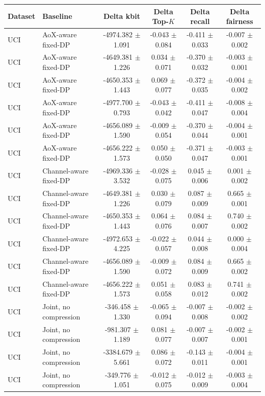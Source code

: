 \begin{tabular}{llcccc}
\toprule
Dataset & Baseline & Delta kbit & Delta Top-$K$ & Delta recall & Delta fairness \\
\midrule
UCI & AoX-aware fixed-DP & -4974.382 $\pm$ 1.091 & -0.043 $\pm$ 0.084 & -0.411 $\pm$ 0.033 & -0.007 $\pm$ 0.002 \\
UCI & AoX-aware fixed-DP & -4649.381 $\pm$ 1.226 & 0.034 $\pm$ 0.071 & -0.370 $\pm$ 0.032 & -0.003 $\pm$ 0.001 \\
UCI & AoX-aware fixed-DP & -4650.353 $\pm$ 1.443 & 0.069 $\pm$ 0.077 & -0.372 $\pm$ 0.035 & -0.004 $\pm$ 0.002 \\
UCI & AoX-aware fixed-DP & -4977.700 $\pm$ 0.793 & -0.043 $\pm$ 0.042 & -0.411 $\pm$ 0.047 & -0.008 $\pm$ 0.004 \\
UCI & AoX-aware fixed-DP & -4656.089 $\pm$ 1.590 & -0.009 $\pm$ 0.054 & -0.370 $\pm$ 0.044 & -0.004 $\pm$ 0.001 \\
UCI & AoX-aware fixed-DP & -4656.222 $\pm$ 1.573 & 0.050 $\pm$ 0.050 & -0.371 $\pm$ 0.047 & -0.003 $\pm$ 0.001 \\
UCI & Channel-aware fixed-DP & -4969.336 $\pm$ 3.532 & -0.028 $\pm$ 0.075 & 0.045 $\pm$ 0.006 & 0.001 $\pm$ 0.002 \\
UCI & Channel-aware fixed-DP & -4649.381 $\pm$ 1.226 & 0.030 $\pm$ 0.079 & 0.087 $\pm$ 0.009 & 0.665 $\pm$ 0.001 \\
UCI & Channel-aware fixed-DP & -4650.353 $\pm$ 1.443 & 0.064 $\pm$ 0.076 & 0.084 $\pm$ 0.007 & 0.740 $\pm$ 0.002 \\
UCI & Channel-aware fixed-DP & -4972.653 $\pm$ 4.225 & -0.022 $\pm$ 0.057 & 0.044 $\pm$ 0.008 & 0.000 $\pm$ 0.004 \\
UCI & Channel-aware fixed-DP & -4656.089 $\pm$ 1.590 & -0.009 $\pm$ 0.072 & 0.084 $\pm$ 0.009 & 0.665 $\pm$ 0.002 \\
UCI & Channel-aware fixed-DP & -4656.222 $\pm$ 1.573 & 0.051 $\pm$ 0.058 & 0.083 $\pm$ 0.012 & 0.741 $\pm$ 0.002 \\
UCI & Joint, no compression & -346.458 $\pm$ 1.330 & -0.065 $\pm$ 0.094 & -0.007 $\pm$ 0.008 & -0.002 $\pm$ 0.002 \\
UCI & Joint, no compression & -981.307 $\pm$ 1.189 & 0.081 $\pm$ 0.077 & -0.007 $\pm$ 0.007 & -0.002 $\pm$ 0.001 \\
UCI & Joint, no compression & -3384.679 $\pm$ 5.661 & 0.086 $\pm$ 0.072 & -0.143 $\pm$ 0.011 & -0.004 $\pm$ 0.001 \\
UCI & Joint, no compression & -349.776 $\pm$ 1.051 & -0.012 $\pm$ 0.075 & -0.012 $\pm$ 0.009 & -0.003 $\pm$ 0.004 \\

\end{tabular}
